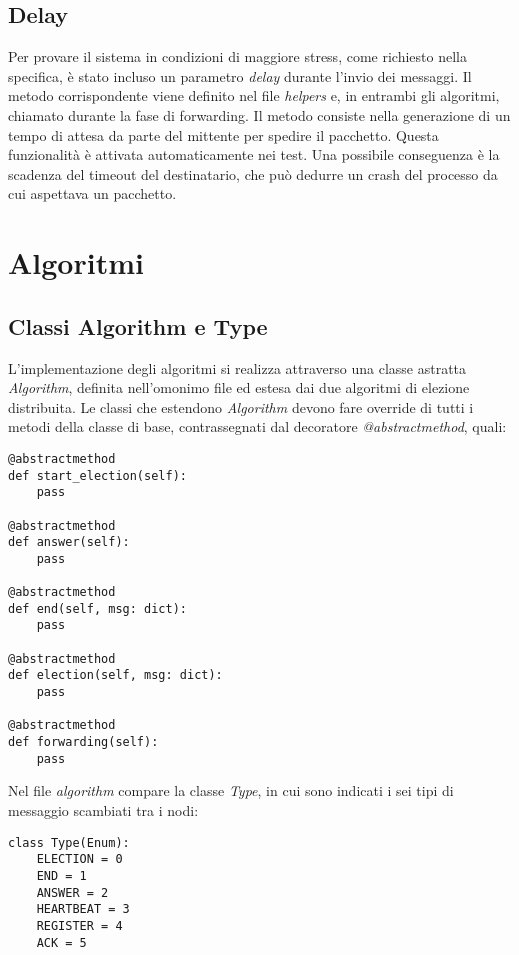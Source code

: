 \documentclass[conference]{IEEEtran}
\begin{document}
\subsection{Delay}\label{delay}

Per provare il sistema in condizioni di maggiore stress, come richiesto nella specifica, è stato incluso un parametro \textit{delay} durante l'invio dei messaggi.
Il metodo corrispondente viene definito nel file \textit{helpers} e, in entrambi gli algoritmi, chiamato durante la fase di forwarding.
Il metodo consiste nella generazione di un tempo di attesa da parte del mittente per spedire il pacchetto.
Questa funzionalità è attivata automaticamente nei test.
Una possibile conseguenza è la scadenza del timeout del destinatario, che può dedurre un crash del processo da cui aspettava un pacchetto.


\section{Algoritmi}\label{sec:algo}


\subsection{Classi Algorithm e Type}\label{algorithm}

L'implementazione degli algoritmi si realizza attraverso una classe astratta \textit{Algorithm}, definita nell'omonimo file ed estesa dai due algoritmi di elezione distribuita.
Le classi che estendono \textit{Algorithm} devono fare override di tutti i metodi della classe di base, contrassegnati dal decoratore \textit{@abstractmethod}, quali:

\begin{lstlisting}
@abstractmethod
def start_election(self):
    pass

@abstractmethod
def answer(self):
    pass

@abstractmethod
def end(self, msg: dict):
    pass

@abstractmethod
def election(self, msg: dict):
    pass

@abstractmethod
def forwarding(self):
    pass
\end{lstlisting}

Nel file \textit{algorithm} compare la classe \textit{Type}, in cui sono indicati i sei tipi di messaggio scambiati tra i nodi:

\begin{lstlisting}
class Type(Enum):
    ELECTION = 0
    END = 1
    ANSWER = 2
    HEARTBEAT = 3
    REGISTER = 4
    ACK = 5
\end{lstlisting}
\end{document}
